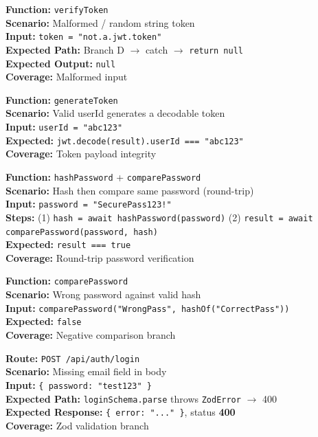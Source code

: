 \documentclass[12pt,onecolumn]{IEEEtran}
\begin{document}
\textbf{Function:} \texttt{verifyToken} \\
\textbf{Scenario:} Malformed / random string token \\
\textbf{Input:} \texttt{token = "not.a.jwt.token"} \\
\textbf{Expected Path:} Branch D $\to$ catch $\to$ \texttt{return null} \\
\textbf{Expected Output:} \texttt{null} \\
\textbf{Coverage:} Malformed input



\textbf{Function:} \texttt{generateToken} \\
\textbf{Scenario:} Valid userId generates a decodable token \\
\textbf{Input:} \texttt{userId = "abc123"} \\
\textbf{Expected:} \texttt{jwt.decode(result).userId === "abc123"} \\
\textbf{Coverage:} Token payload integrity



\textbf{Function:} \texttt{hashPassword} + \texttt{comparePassword} \\
\textbf{Scenario:} Hash then compare same password (round-trip) \\
\textbf{Input:} \texttt{password = "SecurePass123!"} \\
\textbf{Steps:} (1) \texttt{hash = await hashPassword(password)} \quad (2) \texttt{result = await comparePassword(password, hash)} \\
\textbf{Expected:} \texttt{result === true} \\
\textbf{Coverage:} Round-trip password verification



\textbf{Function:} \texttt{comparePassword} \\
\textbf{Scenario:} Wrong password against valid hash \\
\textbf{Input:} \texttt{comparePassword("WrongPass", hashOf("CorrectPass"))} \\
\textbf{Expected:} \texttt{false} \\
\textbf{Coverage:} Negative comparison branch



\textbf{Route:} \texttt{POST /api/auth/login} \\
\textbf{Scenario:} Missing email field in body \\
\textbf{Input:} \texttt{\{ password: "test123" \}} \\
\textbf{Expected Path:} \texttt{loginSchema.parse} throws \texttt{ZodError} $\to$ 400 \\
\textbf{Expected Response:} \texttt{\{ error: "..." \}}, status \textbf{400} \\
\textbf{Coverage:} Zod validation branch
\end{document}
